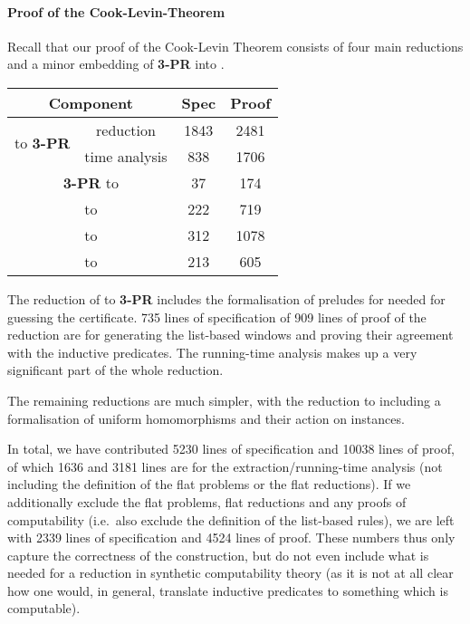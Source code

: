 \paragraph{Proof of the Cook-Levin-Theorem}
Recall that our proof of the Cook-Levin Theorem consists of four main reductions and a minor embedding of \textbf{3-PR} into \PR{}.

\begin{center}
  \begin{tabular}{cccc}
    \multicolumn{2}{c}{Component} & Spec & Proof \\
    \midrule
    \multirow{2}{*}{\gennp{} to \textbf{3-PR}} & reduction & 1843 & 2481 \\ %
                                               & time analysis & 838 & 1706 \\
    \multicolumn{2}{c}{\textbf{3-PR} to \PR{}} & 37 & 174 \\ 
    \multicolumn{2}{c}{\PR{} to \BPR{}} & 222 & 719 \\%
    \multicolumn{2}{c}{\BPR{} to \fsat{}} & 312 & 1078 \\
    \multicolumn{2}{c}{\fsat{} to \SAT{}} & 213 & 605 
  \end{tabular}
\end{center}

The reduction of \gennp{} to \textbf{3-PR} includes the formalisation of preludes for \PR{} needed for guessing the certificate. 735 lines of specification of 909 lines of proof of the reduction are for generating the list-based windows and proving their agreement with the inductive predicates. 
The running-time analysis makes up a very significant part of the whole reduction. 

The remaining reductions are much simpler, with the reduction to \BPR{} including a formalisation of uniform homomorphisms and their action on \PR{} instances.

In total, we have contributed 5230 lines of specification and 10038 lines of proof, of which 1636 and 3181 lines are for the extraction/running-time analysis (not including the definition of the flat problems or the flat reductions). 
If we additionally exclude the flat problems, flat reductions and any proofs of computability (i.e.\ also exclude the definition of the list-based rules), we are left with 2339 lines of specification and 4524 lines of proof. These numbers thus only capture the correctness of the construction, but do not even include what is needed for a reduction in synthetic computability theory (as it is not at all clear how one would, in general, translate inductive predicates to something which is computable).
